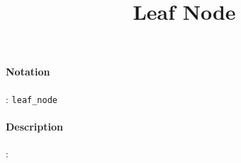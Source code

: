 \documentclass[10pt,a4paper,oneside]{scrartcl}
\author{}
\title{Leaf Node}
\date{}
\begin{document}
\maketitle
\paragraph{Notation}: \texttt{leaf\_node}
\paragraph{Description}:   
\end{document}
